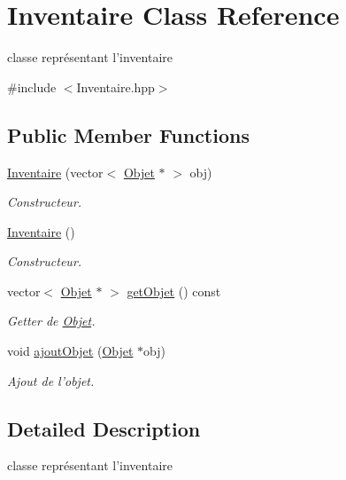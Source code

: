 \hypertarget{classInventaire}{\section{Inventaire Class Reference}
\label{classInventaire}
}


classe représentant l'inventaire  




{\ttfamily \#include $<$Inventaire.\-hpp$>$}

\subsection*{Public Member Functions}
\begin{DoxyCompactItemize}
\item 
\hyperlink{classInventaire_acb6cab61b79c6b737644910bb4364258}{Inventaire} (vector$<$ \hyperlink{classObjet}{Objet} $\ast$ $>$ obj)
\begin{DoxyCompactList}\small\item\em Constructeur. \end{DoxyCompactList}\item 
\hyperlink{classInventaire_af8a3d14c40a06b0f0687006f8355b5b1}{Inventaire} ()
\begin{DoxyCompactList}\small\item\em Constructeur. \end{DoxyCompactList}\item 
vector$<$ \hyperlink{classObjet}{Objet} $\ast$ $>$ \hyperlink{classInventaire_a070c8797d7a064f1091cd958a58c3bc6}{get\-Objet} () const 
\begin{DoxyCompactList}\small\item\em Getter de \hyperlink{classObjet}{Objet}. \end{DoxyCompactList}\item 
void \hyperlink{classInventaire_a0dd20cd850e8f02b2b859bc874829a78}{ajout\-Objet} (\hyperlink{classObjet}{Objet} $\ast$obj)
\begin{DoxyCompactList}\small\item\em Ajout de l'objet. \end{DoxyCompactList}\end{DoxyCompactItemize}


\subsection{Detailed Description}
classe représentant l'inventaire 

